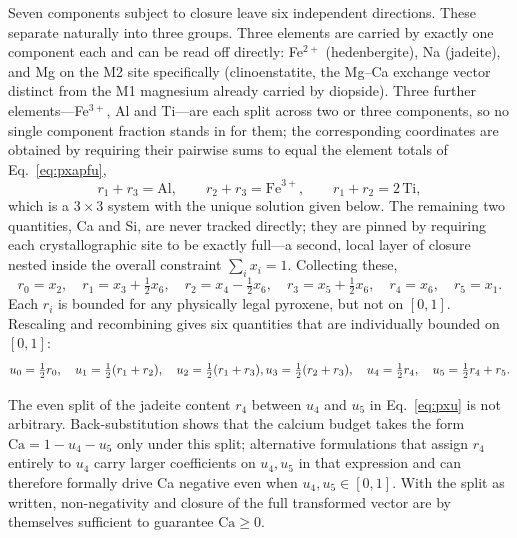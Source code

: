 Seven components subject to closure leave six independent directions. These separate
naturally into three groups. Three elements are carried by exactly one component
each and can be read off directly: Fe$^{2+}$ (hedenbergite), Na (jadeite), and Mg on
the M2 site specifically (clinoenstatite, the Mg--Ca exchange vector distinct from
the M1 magnesium already carried by diopside). Three further elements---Fe$^{3+}$,
Al and Ti---are each split across two or three components, so no single component
fraction stands in for them; the corresponding coordinates are obtained by requiring
their pairwise sums to equal the element totals of Eq.~\eqref{eq:pxapfu},
\begin{equation}
  r_1+r_3 = \mathrm{Al}, \qquad r_2+r_3 = \mathrm{Fe}^{3+}, \qquad
  r_1+r_2 = 2\,\mathrm{Ti},
\end{equation}
which is a $3\times3$ system with the unique solution given below. The remaining two
quantities, Ca and Si, are never tracked directly; they are pinned by requiring each
crystallographic site to be exactly full---a second, local layer of closure nested
inside the overall constraint $\sum_i x_i = 1$. Collecting these,
\begin{equation}
  r_0=x_2,\quad r_1=x_3+\tfrac12 x_6,\quad r_2=x_4-\tfrac12 x_6,\quad
  r_3=x_5+\tfrac12 x_6,\quad r_4=x_6,\quad r_5=x_1 .
  \label{eq:pxr}
\end{equation}
Each $r_i$ is bounded for any physically legal pyroxene, but not on $[0,1]$.
Rescaling and recombining gives six quantities that are individually bounded on
$[0,1]$:
\begin{equation}
  u_0=\tfrac12 r_0,\quad u_1=\tfrac12(r_1+r_2),\quad u_2=\tfrac12(r_1+r_3),\newline
  u_3=\tfrac12(r_2+r_3),\quad u_4=\tfrac12 r_4,\quad u_5=\tfrac12 r_4+r_5 .
  \label{eq:pxu}
\end{equation}

The even split of the jadeite content $r_4$ between $u_4$ and $u_5$ in
Eq.~\eqref{eq:pxu} is not arbitrary. Back-substitution shows that the calcium budget
takes the form $\mathrm{Ca} = 1-u_4-u_5$ only under this split; alternative
formulations that assign $r_4$ entirely to $u_4$ carry larger coefficients on
$u_4,u_5$ in that expression and can therefore formally drive Ca negative even when
$u_4,u_5\in[0,1]$. With the split as written, non-negativity and closure of the full
transformed vector are by themselves sufficient to guarantee $\mathrm{Ca}\ge0$.

